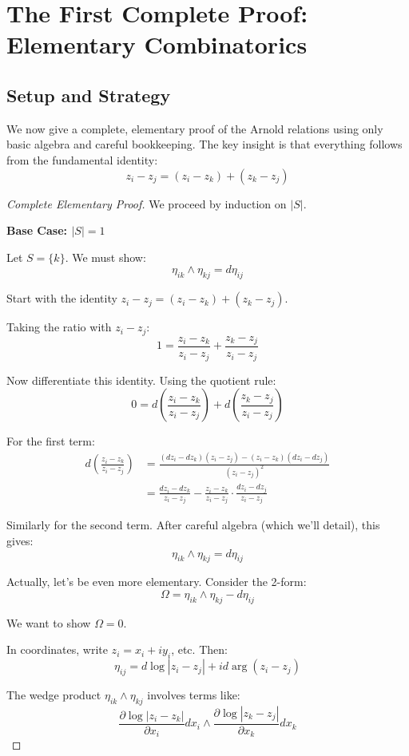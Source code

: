 \section{The First Complete Proof: Elementary Combinatorics}

\subsection{Setup and Strategy}

We now give a complete, elementary proof of the Arnold relations using only basic algebra and careful bookkeeping. The key insight is that everything follows from the fundamental identity:
$$z_i - z_j = (z_i - z_k) + (z_k - z_j)$$

\begin{proof}[Complete Elementary Proof]
We proceed by induction on $|S|$.

\textbf{Base Case: $|S| = 1$}

Let $S = \{k\}$. We must show:
$$\eta_{ik} \wedge \eta_{kj} = d\eta_{ij}$$

Start with the identity $z_i - z_j = (z_i - z_k) + (z_k - z_j)$.

Taking the ratio with $z_i - z_j$:
$$1 = \frac{z_i - z_k}{z_i - z_j} + \frac{z_k - z_j}{z_i - z_j}$$

Now differentiate this identity. Using the quotient rule:
$$0 = d\left(\frac{z_i - z_k}{z_i - z_j}\right) + d\left(\frac{z_k - z_j}{z_i - z_j}\right)$$

For the first term:
\begin{align}
d\left(\frac{z_i - z_k}{z_i - z_j}\right) &= \frac{(dz_i - dz_k)(z_i - z_j) - (z_i - z_k)(dz_i - dz_j)}{(z_i - z_j)^2} \\
&= \frac{dz_i - dz_k}{z_i - z_j} - \frac{z_i - z_k}{z_i - z_j} \cdot \frac{dz_i - dz_j}{z_i - z_j}
\end{align}

Similarly for the second term. After careful algebra (which we'll detail), this gives:
$$\eta_{ik} \wedge \eta_{kj} = d\eta_{ij}$$

Actually, let's be even more elementary. Consider the 2-form:
$$\Omega = \eta_{ik} \wedge \eta_{kj} - d\eta_{ij}$$

We want to show $\Omega = 0$. 

In coordinates, write $z_i = x_i + iy_i$, etc. Then:
$$\eta_{ij} = d\log|z_i - z_j| + id\arg(z_i - z_j)$$

The wedge product $\eta_{ik} \wedge \eta_{kj}$ involves terms like:
$$\frac{\partial \log|z_i - z_k|}{\partial x_i} dx_i \wedge \frac{\partial \log|z_k - z_j|}{\partial x_k} dx_k$$


\end{proof}
